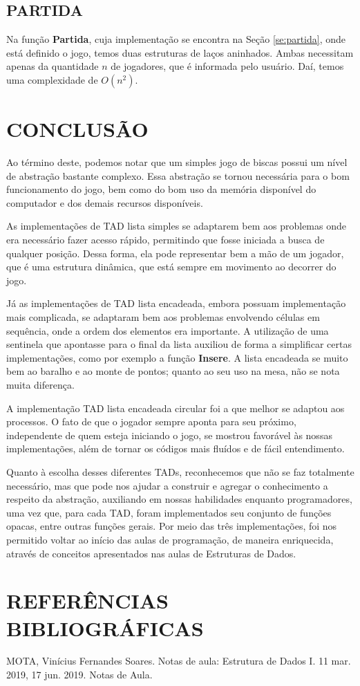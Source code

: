 \documentclass[12pt, oneside, a4paper, brazil]{abntex2}
\begin{document}
\section{PARTIDA}

Na função \textbf{Partida}, cuja implementação se encontra na Seção \ref{se:partida}, onde está definido o jogo, temos duas estruturas de laços aninhados. Ambas necessitam apenas da quantidade $n$ de jogadores, que é informada pelo usuário. Daí, temos uma complexidade de $O(n^2)$.

\chapter*{CONCLUSÃO}

Ao término deste, podemos notar que um simples jogo de biscas possui um nível de abstração bastante complexo. Essa abstração se tornou necessária para o bom funcionamento do jogo, bem como do bom uso da memória disponível do computador e dos demais recursos disponíveis.

As implementações de TAD lista simples se adaptarem bem aos problemas onde era necessário fazer acesso rápido, permitindo que fosse iniciada a busca de qualquer posição. Dessa forma, ela pode representar bem a mão de um jogador, que é uma estrutura dinâmica, que está sempre em movimento ao decorrer do jogo.

Já as implementações de TAD lista encadeada, embora possuam implementação mais complicada, se adaptaram bem aos problemas envolvendo células em sequência, onde a ordem dos elementos era importante. A utilização de uma sentinela que apontasse para o final da lista auxiliou de forma a simplificar certas implementações, como por exemplo a função \textbf{Insere}. A lista encadeada se muito bem ao baralho e ao monte de pontos; quanto ao seu uso na mesa, não se nota muita diferença.

A implementação TAD lista encadeada circular foi a que melhor se adaptou aos processos. O fato de que o jogador sempre aponta para seu próximo, independente de quem esteja iniciando o jogo, se mostrou favorável às nossas implementações, além de tornar os códigos mais fluídos e de fácil entendimento.

Quanto à escolha desses diferentes TADs, reconhecemos que não se faz totalmente necessário, mas que pode nos ajudar a construir e agregar o conhecimento a respeito da abstração, auxiliando em nossas habilidades enquanto programadores, uma vez que, para cada TAD, foram implementados seu conjunto de funções opacas, entre outras funções gerais. Por meio das três implementações, foi nos permitido voltar ao início das aulas de programação, de maneira enriquecida, através de conceitos apresentados nas aulas de Estruturas de Dados.

\chapter*{REFERÊNCIAS BIBLIOGRÁFICAS}

    MOTA, Vinícius Fernandes Soares. Notas de aula: Estrutura de Dados I. 11 mar. 2019, 17 jun. 2019. Notas de Aula.
\end{document}
